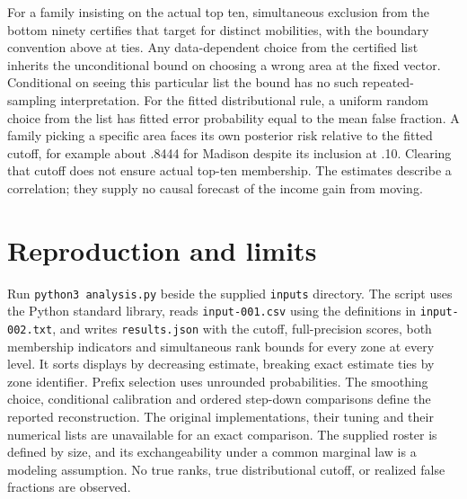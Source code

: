 \documentclass[11pt]{article}
\begin{document}
For a family insisting on the actual top ten, simultaneous exclusion from the bottom ninety certifies that target for distinct mobilities, with the boundary convention above at ties. Any data-dependent choice from the certified list inherits the unconditional bound on choosing a wrong area at the fixed vector. Conditional on seeing this particular list the bound has no such repeated-sampling interpretation. For the fitted distributional rule, a uniform random choice from the list has fitted error probability equal to the mean false fraction. A family picking a specific area faces its own posterior risk relative to the fitted cutoff, for example about .8444 for Madison despite its inclusion at .10. Clearing that cutoff does not ensure actual top-ten membership. The estimates describe a correlation; they supply no causal forecast of the income gain from moving.

\section{Reproduction and limits}
Run \texttt{python3 analysis.py} beside the supplied \texttt{inputs} directory. The script uses the Python standard library, reads \texttt{input-001.csv} using the definitions in \texttt{input-002.txt}, and writes \texttt{results.json} with the cutoff, full-precision scores, both membership indicators and simultaneous rank bounds for every zone at every level. It sorts displays by decreasing estimate, breaking exact estimate ties by zone identifier. Prefix selection uses unrounded probabilities. The smoothing choice, conditional calibration and ordered step-down comparisons define the reported reconstruction. The original implementations, their tuning and their numerical lists are unavailable for an exact comparison. The supplied roster is defined by size, and its exchangeability under a common marginal law is a modeling assumption. No true ranks, true distributional cutoff, or realized false fractions are observed.
\end{document}
